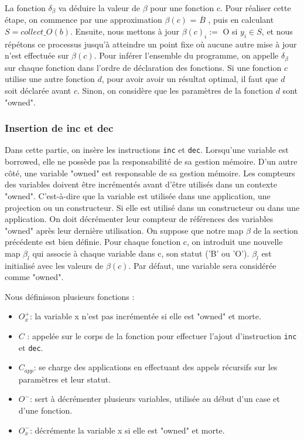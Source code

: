 \documentclass{rapportECL}
\begin{document}
La fonction $\delta_{\beta}$ va déduire la valeur de $\beta$ pour une fonction c. 
Pour réaliser cette étape, on commence par une approximation $\beta(c)$ = $\overline{B}$ , puis en calculant $S = collect\_O(b)$. 
Ensuite, nous mettons à jour  $\beta(c)_i :=$ O  si $y_i \in S $, et nous répétons ce processus jusqu'à atteindre un point fixe où aucune autre mise à jour 
n'est effectuée sur $\beta(c)$.
Pour inférer l'ensemble du programme, on appelle $\delta_{\beta}$ sur chaque fonction dans l'ordre de déclaration des fonctions. 
Si une fonction $c$ utilise une autre fonction $d$, pour avoir avoir un résultat optimal, il faut que $d$ soit déclarée avant $c$. 
Sinon, on considère que les paramètres de la fonction $d$ sont "owned".


\subsubsection{Insertion de inc et dec}
Dans cette partie, on insère les instructions \verb|inc| et \verb|dec|.
Lorsqu'une variable est borrowed, elle ne possède pas la responsabilité de sa gestion mémoire. 
D'un autre côté, une variable "owned" est responsable de sa gestion mémoire.
Les compteurs des variables doivent être incrémentés avant d'être utilisés dans un contexte "owned". 
C'est-à-dire que la variable est utilisée dans une application, une projection ou un constructeur.
Si elle est utilisé dans un constructeur ou dans une application.
On doit décrémenter leur compteur de références des variables "owned" après leur dernière utilisation. 
On suppose que notre map $\beta$ de la section précédente est bien définie. 
Pour chaque fonction c, on introduit une nouvelle map $\beta_l$ qui associe à chaque variable dans c, son statut ('B' ou 'O'). 
$\beta_l$ est initialisé avec les valeurs de $\beta(c)$. Par défaut, une variable sera considérée comme "owned".

Nous définisson plusieurs fonctions :
\begin{itemize}
    \item $O_x^{+}$: la variable x n'est pas incrémentée si elle est "owned" et morte.
    \item $C$ : appelée sur le corps de la fonction pour effectuer l'ajout d'instruction \verb|inc| et \verb|dec|.
    \item $C_{app}$: se charge des applications en effectuant des appels récursifs sur les paramètres et leur statut.
    \item $O^{-}$: sert à décrémenter plusieurs variables, utilisée au début d'un case et d'une fonction.
    \item  $O_x^{-}$: décrémente la variable x si elle est "owned" et morte.   
\end{itemize}
\end{document}

